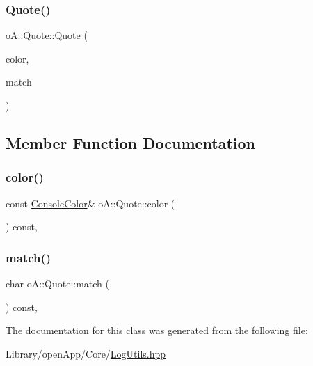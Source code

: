 \subsubsection{\texorpdfstring{Quote()}{Quote()}}
{\footnotesize\ttfamily o\+A\+::\+Quote\+::\+Quote (\begin{DoxyParamCaption}\item[{const \mbox{\hyperlink{namespaceo_a_a747e07c1977a29f3e1d38683043ec927}{Console\+Color}} \&}]{color,  }\item[{char}]{match }\end{DoxyParamCaption})\hspace{0.3cm}{\ttfamily [inline]}}



\subsection{Member Function Documentation}
\mbox{\label{classo_a_1_1_quote_a2230c25c43af7317d5ab5785b382f2ce}} 
\subsubsection{\texorpdfstring{color()}{color()}}
{\footnotesize\ttfamily const \mbox{\hyperlink{namespaceo_a_a747e07c1977a29f3e1d38683043ec927}{Console\+Color}}\& o\+A\+::\+Quote\+::color (\begin{DoxyParamCaption}\item[{void}]{ }\end{DoxyParamCaption}) const\hspace{0.3cm}{\ttfamily [inline]}, {\ttfamily [noexcept]}}

\mbox{\label{classo_a_1_1_quote_a3347e15b8ef676b7a5b2017b80e8befc}} 
\subsubsection{\texorpdfstring{match()}{match()}}
{\footnotesize\ttfamily char o\+A\+::\+Quote\+::match (\begin{DoxyParamCaption}\item[{void}]{ }\end{DoxyParamCaption}) const\hspace{0.3cm}{\ttfamily [inline]}, {\ttfamily [noexcept]}}



The documentation for this class was generated from the following file\+:\begin{DoxyCompactItemize}
\item 
Library/open\+App/\+Core/\mbox{\hyperlink{_log_utils_8hpp}{Log\+Utils.\+hpp}}\end{DoxyCompactItemize}
